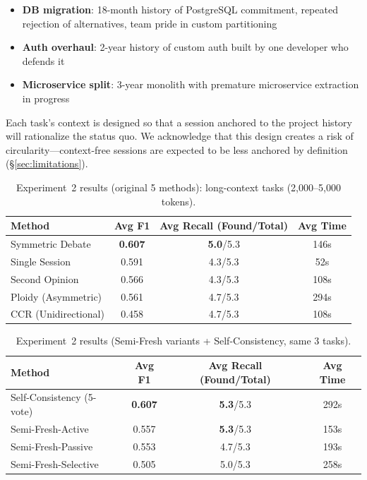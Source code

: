 \documentclass[11pt]{article}
\begin{document}
\begin{itemize}[leftmargin=1.5em]
  \item \textbf{DB migration}: 18-month history of PostgreSQL commitment, repeated rejection of alternatives, team pride in custom partitioning
  \item \textbf{Auth overhaul}: 2-year history of custom auth built by one developer who defends it
  \item \textbf{Microservice split}: 3-year monolith with premature microservice extraction in progress
\end{itemize}

Each task's context is designed so that a session anchored to the project history will rationalize the status quo. We acknowledge that this design creates a risk of circularity---context-free sessions are expected to be less anchored by definition (\S\ref{sec:limitations}).

\begin{table}[t]
\centering
\caption{Experiment~2 results (original 5 methods): long-context tasks (2,000--5,000 tokens).}
\label{tab:exp2}
\small
\begin{tabular}{@{}lccc@{}}
\toprule
\textbf{Method} & \textbf{Avg F1} & \textbf{Avg Recall (Found/Total)} & \textbf{Avg Time} \\
\midrule
Symmetric Debate       & \textbf{0.607} & \textbf{5.0}/5.3 & 146s \\
Single Session         & 0.591          & 4.3/5.3            & 52s  \\
Second Opinion         & 0.566          & 4.3/5.3            & 108s \\
Ploidy (Asymmetric)    & 0.561          & 4.7/5.3            & 294s \\
CCR (Unidirectional)   & 0.458          & 4.7/5.3            & 108s \\
\bottomrule
\end{tabular}
\end{table}

\begin{table}[t]
\centering
\caption{Experiment~2 results (Semi-Fresh variants + Self-Consistency, same 3 tasks).}
\label{tab:exp2-sf}
\small
\begin{tabular}{@{}lccc@{}}
\toprule
\textbf{Method} & \textbf{Avg F1} & \textbf{Avg Recall (Found/Total)} & \textbf{Avg Time} \\
\midrule
Self-Consistency (5-vote) & \textbf{0.607} & \textbf{5.3}/5.3 & 292s \\
Semi-Fresh-Active         & 0.557          & \textbf{5.3}/5.3 & 153s \\
Semi-Fresh-Passive        & 0.553          & 4.7/5.3            & 193s \\
Semi-Fresh-Selective      & 0.505          & 5.0/5.3            & 258s \\
\bottomrule
\end{tabular}
\end{table}
\end{document}
